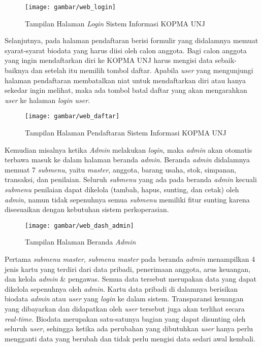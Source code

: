 \begin{figure}[H]
	\centering
	\texttt{[image: gambar/web\_login]}
	\caption{Tampilan Halaman \textit{Login} Sistem Informasi KOPMA UNJ}
\end{figure} 

Selanjutnya, pada halaman pendaftaran berisi formulir yang didalamnya memuat syarat-syarat biodata yang harus diisi oleh calon anggota. Bagi calon anggota yang ingin mendaftarkan diri ke KOPMA UNJ harus mengisi data sebaik-baiknya dan setelah itu memilih tombol daftar. Apabila \textit{user} yang mengunjungi halaman pendaftaran membatalkan niat untuk mendaftarkan diri atau hanya sekedar ingin melihat, maka ada tombol batal daftar yang akan mengarahkan \textit{user} ke halaman \textit{login user}.

\begin{figure}[H]
	\centering
	\texttt{[image: gambar/web\_daftar]}
	\caption{Tampilan Halaman Pendaftaran Sistem Informasi KOPMA UNJ}
\end{figure} 

Kemudian misalnya ketika \textit{Admin} melakukan \textit{login}, maka \textit{admin} akan otomatis terbawa masuk ke dalam halaman beranda \textit{admin}. Beranda \textit{admin} didalamnya memuat 7 \textit{submenu}, yaitu \textit{master}, anggota, barang usaha, stok, simpanan, transaksi, dan penilaian. Seluruh \textit{submenu} yang ada pada beranda \textit{admin} kecuali \textit{submenu} penilaian dapat dikelola (tambah, hapus, sunting, dan cetak) oleh \textit{admin}, namun tidak sepenuhnya semua \textit{submenu} memiliki fitur sunting karena disesuaikan dengan kebutuhan sistem perkoperasian.

\begin{figure}[H]
	\centering
	\texttt{[image: gambar/web\_dash\_admin]}
	\caption{Tampilan Halaman Beranda \textit{Admin}}
\end{figure} 

Pertama \textit{submenu master}, \textit{submenu master} pada beranda \textit{admin} menampilkan 4 jenis kartu yang terdiri dari data pribadi, penerimaan anggota, arus keuangan, dan kelola \textit{admin} \& pengawas. Semua data tersebut merupakan data yang dapat dikelola sepenuhnya oleh \textit{admin}. Kartu data pribadi di dalamnya berisikan biodata \textit{admin} atau \textit{user} yang \textit{login} ke dalam sistem. Transparansi keuangan yang dibayarkan dan didapatkan oleh \textit{user} tersebut juga akan terlihat secara \textit{real-time}. Biodata merupakan satu-satunya bagian yang dapat disunting oleh seluruh \textit{user}, sehingga ketika ada perubahan yang dibutuhkan \textit{user} hanya perlu mengganti data yang berubah dan tidak perlu mengisi data sedari awal kembali.

